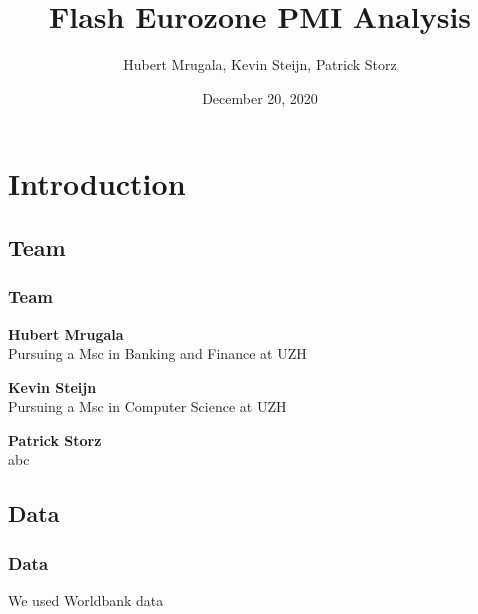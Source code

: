 \documentclass[10pt]{beamer}
\begin{document}
\title{Flash Eurozone PMI Analysis}
\author{Hubert Mrugala, Kevin Steijn, Patrick Storz}
\date{December 20, 2020} %

\begin{frame}
\titlepage
\end{frame}
\section{Introduction}
\begin{frame}
\subsection{Team}
\frametitle{Team}

\textbf{Hubert Mrugala} \\
Pursuing a Msc in Banking and Finance at UZH

\vspace{3mm}

\textbf{Kevin Steijn} \\
Pursuing a Msc in Computer Science at UZH

\vspace{3mm}

\textbf{Patrick Storz} \\
abc
\end{frame}
\begin{frame}
\subsection{Data}
\frametitle{Data}

We used Worldbank data

\end{frame}
\end{document}
